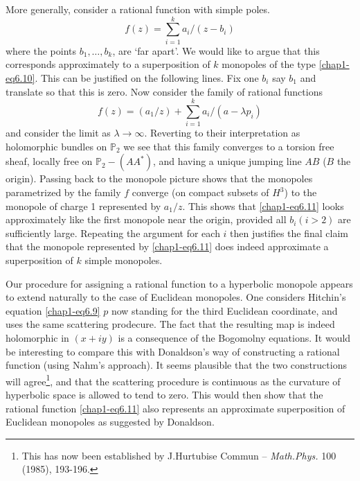 More generally, consider a rational function with simple poles.
\begin{equation}
f(z)=\sum^{k}_{i=1}a_{i}/(z-b_{i})\label{chap1-eq6.11}
\end{equation}
where the points $b_{1},\ldots,b_{k}$, are `far apart'. We would like
to argue that this corresponds approximately to a superposition of $k$
monopoles of the type \eqref{chap1-eq6.10}. This can be justified on
the following lines. Fix one $b_{i}$ say $b_{1}$ and translate so that
this is zero. Now consider the family of rational functions
$$
f(z)=(a_{1}/z)+\sum^{k}_{i=1}a_{i}/(a-\lambda p_{i})
$$
and consider the limit as $\lambda\to \infty$. Reverting to their
interpretation as holomorphic bundles on $\mathbb{P}_{2}$ we see that
this family converges to a torsion free sheaf, locally free on
$\mathbb{P}_{2}-(AA^{*})$, and having a unique jumping line $AB$ ($B$
the origin). Passing back to the monopole picture shows that the
monopoles parametrized by the family $f$ converge (on compact subsets
of $H^{3}$) to the monopole of charge 1 represented by $a_{1}/z$. This
shows that \eqref{chap1-eq6.11} looks approximately like the first
monopole near the origin, provided all $b_{i}(i>2)$ are sufficiently
large. Repeating the argument for each $i$ then justifies the final
claim that the monopole represented by \eqref{chap1-eq6.11} does
indeed approximate a superposition of $k$ simple monopoles.

Our procedure for assigning a rational function to a hyperbolic\break
mono\-pole appears to extend naturally to the case of Euclidean
mono\-poles. One considers Hitchin's equation \eqref{chap1-eq6.9} $p$
now standing for the third Euclidean coordinate, and uses the
same\pageoriginale 
scattering prodecure. The fact that the resulting map is indeed
holomorphic in $(x+iy)$ is a consequence of the Bogomolny
equations. It would be interesting to compare this with Donaldson's
way \cite{chap1-key5} of constructing a rational function (using
Nahm's approach). It seems plausible that the two constructions will
agree\footnote{This has now been established by J.\@ Hurtubise Commun
-- {\em Math.\@ Phys.} 100 (1985), 193-196.}, and that the scattering
procedure is continuous as the curvature of hyperbolic space is
allowed to tend to zero. This would then show that the rational
function \eqref{chap1-eq6.11} also represents an approximate
superposition of Euclidean monopoles as suggested by Donaldson. 

